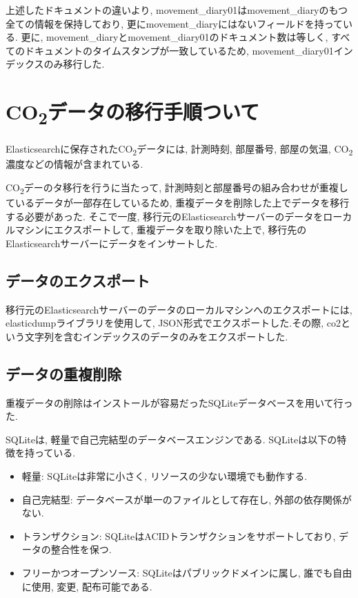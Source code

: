 上述したドキュメントの違いより, movement\_diary01はmovement\_diaryのもつ全ての情報を保持しており, 更にmovement\_diaryにはないフィールドを持っている. 更に, movement\_diaryとmovement\_diary01のドキュメント数は等しく, すべてのドキュメントのタイムスタンプが一致しているため, movement\_diary01インデックスのみ移行した.

\section{CO\textsubscript{2}データの移行手順ついて}
Elasticsearchに保存されたCO\textsubscript{2}データには, 計測時刻, 部屋番号, 部屋の気温, CO\textsubscript{2}濃度などの情報が含まれている.

CO\textsubscript{2}デーのタ移行を行うに当たって, 計測時刻と部屋番号の組み合わせが重複しているデータが一部存在しているため, 重複データを削除した上でデータを移行する必要があった. そこで一度, 移行元のElasticsearchサーバーのデータをローカルマシンにエクスポートして, 重複データを取り除いた上で, 移行先のElasticsearchサーバーにデータをインサートした.

\subsection{データのエクスポート}
移行元のElasticsearchサーバーのデータのローカルマシンへのエクスポートには, elasticdumpライブラリを使用して, JSON形式でエクスポートした.その際, co2という文字列を含むインデックスのデータのみをエクスポートした.

\subsection{データの重複削除}
重複データの削除はインストールが容易だったSQLiteデータベースを用いて行った.

SQLiteは, 軽量で自己完結型のデータベースエンジンである. SQLiteは以下の特徴を持っている.

\begin{itemize}
  \item 軽量: SQLiteは非常に小さく, リソースの少ない環境でも動作する.
  \item 自己完結型: データベースが単一のファイルとして存在し, 外部の依存関係がない.
  \item 
        トランザクション: SQLiteはACIDトランザクションをサポートしており, データの整合性を保つ. 
  \item 
        フリーかつオープンソース: SQLiteはパブリックドメインに属し, 誰でも自由に使用, 変更, 配布可能である.
\end{itemize}

